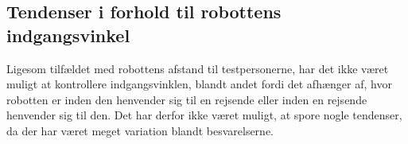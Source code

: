 \subsection{Tendenser i forhold til robottens indgangsvinkel}
\label{DatabehandlingIndgangsvinkelTendenser}
%
Ligesom tilfældet med robottens afstand til testpersonerne, har det ikke været muligt at kontrollere indgangsvinklen, blandt andet fordi det afhænger af, hvor robotten er inden den henvender sig til en rejsende eller inden en rejsende henvender sig til den. Det har derfor ikke været muligt, at spore nogle tendenser, da der har været meget variation blandt besvarelserne.  

